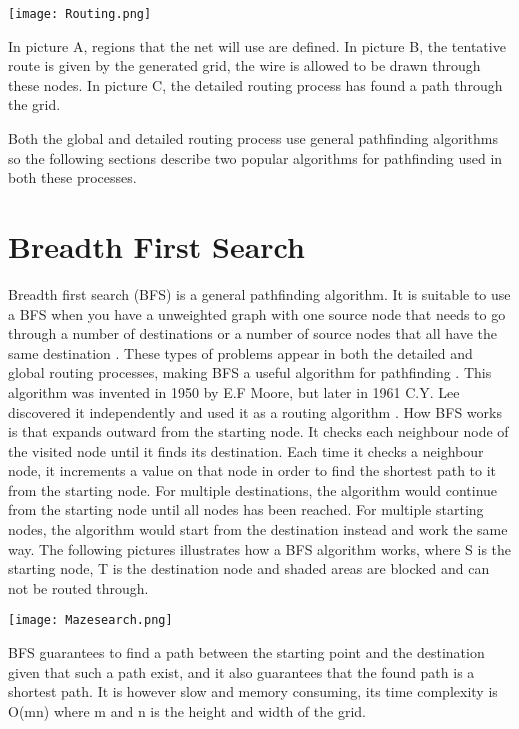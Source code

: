 \documentclass{kththesis}
\begin{document}
\texttt{[image: Routing.png]}
 
In picture A, regions that the net will use are defined. In picture B, the tentative route is given by the generated grid, the wire is allowed to be drawn through these nodes. In picture C, the detailed routing process has found a path through the grid.
 
Both the global and detailed routing process use general pathfinding algorithms so the following sections describe two popular algorithms for pathfinding used in both these processes.
 
\section{Breadth First Search}
Breadth first search (BFS) is a general pathfinding algorithm. It is suitable to use a BFS when you have a unweighted graph with one source node that needs to go through a number of destinations or a number of source nodes that all have the same destination \parencite{redbloggames}. These types of problems appear in both the detailed and global routing processes, making BFS a useful algorithm for pathfinding \parencite{EDA_routing}. This algorithm was invented in 1950 by E.F Moore, but later in 1961 C.Y. Lee discovered it independently and used it as a routing algorithm \parencite{idash}\parencite{lee}. 
How BFS works is that expands outward from the starting node. It checks each neighbour node of the visited node until it finds its destination. Each time it checks a neighbour node, it increments a value on that node in order to find the shortest path to it from the starting node. For multiple destinations, the algorithm would continue from the starting node until all nodes has been reached. For multiple starting nodes, the algorithm would start from the destination instead and work the same way. The following pictures illustrates how a BFS algorithm works, where S is the starting node, T is the destination node and shaded areas are blocked and can not be routed through.
 
\texttt{[image: Mazesearch.png]}
 
BFS guarantees to find a path between the starting point and the destination given that such a path exist, and it also guarantees that the found path is a shortest path. It is however slow and memory consuming, its time complexity is O(mn) where m and n is the height and width of the grid. 
 
\end{document}
